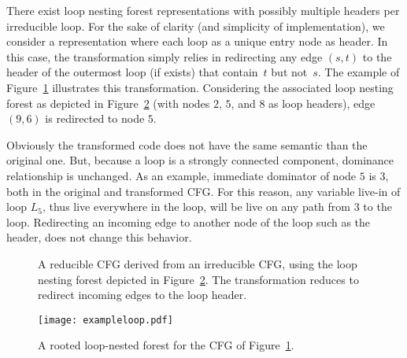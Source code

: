 There exist loop nesting forest representations with possibly multiple headers per irreducible loop.
For the sake of clarity (and simplicity of implementation), we consider a representation where each loop as a unique entry node as header.
In this case, the transformation simply relies in redirecting any edge $(s,t)$ to the header of the outermost loop (if exists) that contain~$t$ but not~$s$.
The example of Figure~\ref{fig:examplecfg} illustrates this transformation.
Considering the associated loop nesting forest as depicted in Figure~\ref{fig:exampleloop} (with nodes $2$, $5$, and $8$ as loop headers), edge $(9,6)$ is redirected to node $5$.

Obviously the transformed code does not have the same semantic than the original one.
But, because a loop is a strongly connected component, dominance relationship is unchanged.
As an example, immediate dominator of node $5$ is $3$, both in the original and transformed CFG.
For this reason, any variable live-in of loop $L_5$, thus live everywhere in the loop, will be live on any path from $3$ to the loop.
Redirecting an incoming edge to another node of the loop such as the header, does not change this behavior.

\begin{figure}[t]
  \begin{center}
    \hspace{4mm}
  \end{center}
  \caption{%
	  A reducible CFG derived from an irreducible CFG, using the loop nesting forest depicted in Figure~\ref{fig:exampleloop}.
	  The transformation reduces to redirect incoming edges to the loop header.}
  \label{fig:examplecfg}
\end{figure}

\begin{figure}[t]
  \begin{center}
    \texttt{[image: exampleloop.pdf]}
  \end{center}
  \caption{A rooted loop-nested forest for the CFG of Figure~\ref{fig:examplecfg}.}
  \label{fig:exampleloop}
\end{figure}

\newcommand{\OLE}[2]{#1.\textsf{OLE}(#2)}

